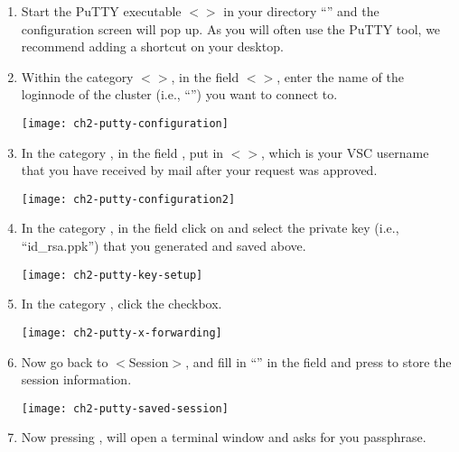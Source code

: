   \begin{enumerate}
    \item  Start the PuTTY executable $<$$>$ in your
      directory ``'' and the
      configuration screen will pop up. As you will often use the PuTTY tool,
      we recommend adding a shortcut on your desktop.
    \item  Within the category $<$$>$, in the field
      $<$$>$, enter the name of the loginnode of the
      \hpc cluster (i.e., ``\strong{\emph{\loginnode}}'')
      you want to connect to.

    \texttt{[image: ch2-putty-configuration]}

    \item  In the category , in
      the field , put in
      $<$\emph{\userid}$>$, which is your VSC username that you have
      received by mail after your request was approved.

  \texttt{[image: ch2-putty-configuration2]}

    \item  In the category , in the
      field  click on
       and select the private key (i.e., ``id\_rsa.ppk'')
      that you generated and saved above.

  \texttt{[image: ch2-putty-key-setup]}

    \item  In the category , click
      the  checkbox.

  \texttt{[image: ch2-putty-x-forwarding]}

    \item  Now go back to $<$Session$>$, and fill in ``\emph{\hpcname}'' in the
       field and press  to
      store the session information.

  \texttt{[image: ch2-putty-saved-session]}

    \item  Now pressing , will open a terminal window and
      asks for you passphrase.


\end{enumerate}
